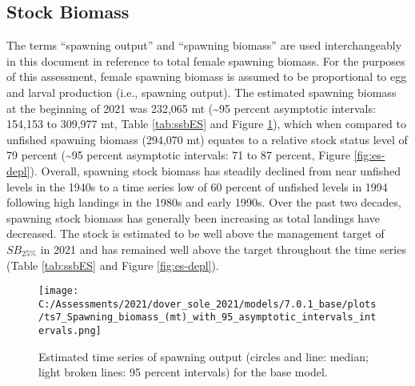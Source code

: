 \documentclass[11pt,
  english,
  a4paper,
]{article}
\begin{document}
\leavevmode\tagmcend\tagstructend\par


\hypertarget{stock-biomass}{%
\subsection*{Stock Biomass}\label{stock-biomass}}

\leavevmode\tagmcend\tagstructend


The terms ``spawning output'' and ``spawning biomass'' are used interchangeably in this document in reference to total female spawning biomass. For the purposes of this assessment, female spawning biomass is assumed to be proportional to egg and larval production (i.e., spawning output). The estimated spawning biomass at the beginning of 2021 was 232,065 mt (\textasciitilde95 percent asymptotic intervals: 154,153 to 309,977 mt, Table \ref{tab:ssbES} and Figure \ref{fig:es-ssb}), which when compared to unfished spawning biomass (294,070 mt) equates to a relative stock status level of 79 percent (\textasciitilde95 percent asymptotic intervals: 71 to 87 percent, Figure \ref{fig:es-depl}). Overall, spawning stock biomass has steadily declined from near unfished levels in the 1940s to a time series low of 60 percent of unfished levels in 1994 following high landings in the 1980s and early 1990s. Over the past two decades, spawning stock biomass has generally been increasing as total landings have decreased. The stock is estimated to be well above the management target of {\(SB_{25\%}\)\leavevmode\tagmcend\tagstructend} in 2021 and has remained well above the target throughout the time series (Table \ref{tab:ssbES} and Figure \ref{fig:es-depl}).

\leavevmode\tagmcend\tagstructend\par




\begin{figure}
\centering
\texttt{[image: C:/Assessments/2021/dover\_sole\_2021/models/7.0.1\_base/plots/ts7\_Spawning\_biomass\_(mt)\_with\_95\_asymptotic\_intervals\_intervals.png]}
\caption{Estimated time series of spawning output (circles and line: median; light broken lines: 95 percent intervals) for the base model.\label{fig:es-ssb}}
\end{figure}
\end{document}
